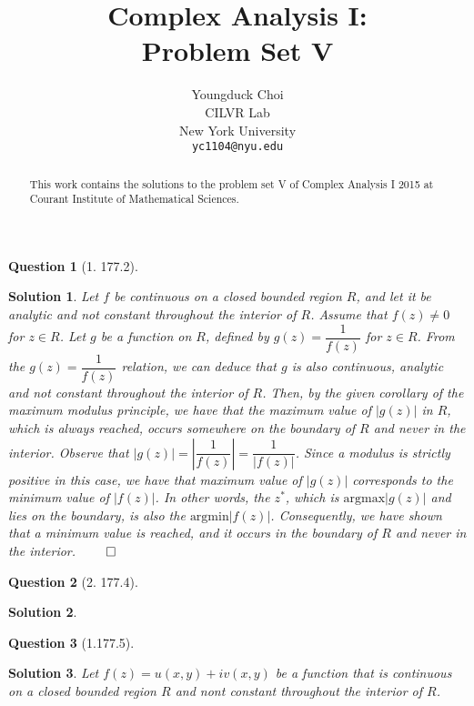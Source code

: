 \documentclass{article} %
\title{Complex Analysis I: \\
Problem Set V}
\author{
Youngduck Choi \\
CILVR Lab \\
New York University\\
\texttt{yc1104@nyu.edu} \\
}
\theoremstyle{quest}
\newtheorem*{question}{Question}
\newtheorem*{solution}{Solution}
\begin{document}
\maketitle

\begin{abstract}
This work contains the solutions to the problem set V
of Complex Analysis I 2015 at Courant Institute of Mathematical Sciences.
\end{abstract}

\bigskip

\begin{question}[1. 177.2]
\end{question}
\begin{solution}
Let $f$ be continuous on a closed bounded region $R$, and let it be
analytic and not constant throughout the interior of $R$. Assume 
that $f(z) \neq 0$ for $z \in R$. Let $g$ be a function on $R$,
defined by $g(z) = \dfrac{1}{f(z)}$ for $z \in R$. From the $g(z) = 
\dfrac{1}{f(z)}$ relation, we can deduce that
$g$ is also continuous, analytic and not constant throughout the interior
of $R$. Then, by the given corollary of the maximum modulus principle,
we have that the maximum value of $|g(z)|$ in $R$, which is always 
reached, occurs somewhere on the boundary of $R$ and never in the interior.
Observe that $|g(z)| = |\dfrac{1}{f(z)}| = \dfrac{1}{|f(z)|}$. Since
a modulus is strictly positive in this case, we have that maximum value
of $|g(z)|$ corresponds to the minimum value of $|f(z)|$. 
In other words,
the $z^*$, which is $\text{argmax} |g(z)|$ and lies on the boundary, is also
the $\text{argmin} |f(z)|$. Consequently, we have shown that a minimum
value is reached, and it occurs in the boundary of $R$ and never in
the interior. $\qed$ 
\end{solution}

\bigskip

\begin{question}[2. 177.4]
\end{question}
\begin{solution}
\end{solution}



\bigskip

\begin{question}[1.177.5]
\end{question}
\begin{solution}
Let $f(z) = u(x,y) + iv(x,y)$ be a function that is continuous on a closed
bounded region $R$ and nont constant throughout the interior of $R$.
\end{solution}
\end{document}
